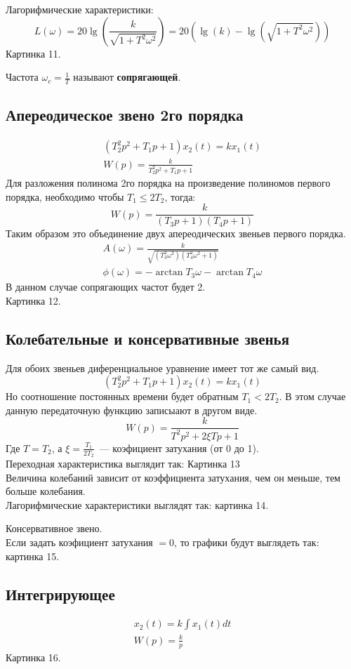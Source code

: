 	Лагорифмические характеристики:
	$$L(\omega)=20\lg(\frac{k}{\sqrt{1+T^2\omega^2}})=20(\lg(k)-\lg(\sqrt{1+T^2\omega^2}))$$
	Картинка 11.

	Частота $\omega_c=\frac{1}{T}$ называют \textbf{сопрягающей}.

\subsection{Апереодическое звено 2го порядка}
	\begin{gather*}
		(T_2^2p^2+T_1p+1)x_2(t)=kx_1(t)\\
		W(p)=\frac{k}{T^2_2p^2+T_1p+1}
	\end{gather*}
	Для разложения полинома 2го порядка на произведение полиномов первого порядка, необходимо чтобы $T_1\leq2T_2$, тогда:
	$$W(p)=\frac{k}{(T_3p+1)(T_4p+1)}$$
	Таким образом это объединение двух апереодических звеньев первого порядка.
	\begin{gather*}
		A(\omega)=\frac{k}{\sqrt{(T_3^2\omega^2)(T_4^2\omega^2+1)}}\\
		\phi(\omega)=-\arctan{}T_3\omega-\arctan{}T_4\omega
	\end{gather*}
	В данном случае сопрягающих частот будет 2.\\
	Картинка 12.
\subsection{Колебательные и консервативные звенья}
	Для обоих звеньев диференциальное уравнение имеет тот же самый вид.
	$$(T_2^2p^2+T_1p+1)x_2(t)=kx_1(t)$$
	Но соотношение постоянных времени будет обратным $T_1<2T_2$. В этом случае данную передаточную функцию записыают в другом виде.
	$$W(p)=\frac{k}{T^2p^2+2\xi{}Tp+1}$$
	Где $T=T_2$, а $\xi=\frac{T_1}{2T_2}$~--- коэфициент затухания (от 0 до 1).\\
	Переходная характеристика выглядит так: Картинка 13\\
	Величина колебаний зависит от коэффициента затухания, чем он меньше, тем больше колебания.\\
	Лагорифмические характеристики выглядят так: картинка 14.
	
	Консервативное звено.\\
	Если задать коэфициент затухания $=0$, то графики будут выглядеть так: картинка 15.
	
\subsection{Интегрирующее}
	\begin{gather*}
		x_2(t)=k\int{}x_1(t)dt \\
		W(p)=\frac{k}{p}
	\end{gather*}
	Картинка 16.
